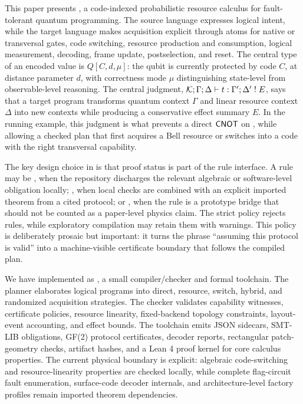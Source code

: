 This paper presents \system, a code-indexed probabilistic resource calculus for fault-tolerant quantum programming.
The source language expresses logical intent, while the target language makes acquisition explicit through atoms for native or transversal gates, code switching, resource production and consumption, logical measurement, decoding, frame update, postselection, and reset.
The central type of an encoded value is $Q[C,d,\mu]$: the qubit is currently protected by code $C$, at distance parameter $d$, with correctness mode $\mu$ distinguishing state-level from observable-level reasoning.
The central judgment, $\mathcal{K};\Gamma;\Delta \vdash t : \Gamma';\Delta' \;!\; E$, says that a target program transforms quantum context $\Gamma$ and linear resource context $\Delta$ into new contexts while producing a conservative effect summary $E$.
In the running example, this judgment is what prevents a direct $\mathsf{CNOT}$ on , while allowing a checked plan that first acquires a Bell resource or switches into a code with the right transversal capability.

The key design choice in \system is that proof status is part of the rule interface.
A rule may be \Checked, when the repository discharges the relevant algebraic or software-level obligation locally; \Certified, when local checks are combined with an explicit imported theorem from a cited protocol; or \Assumed, when the rule is a prototype bridge that should not be counted as a paper-level physics claim.
The strict policy rejects \Assumed{} rules, while exploratory compilation may retain them with warnings.
This policy is deliberately prosaic but important: it turns the phrase ``assuming this protocol is valid'' into a machine-visible certificate boundary that follows the compiled plan.

We have implemented \system as \lang, a small compiler/checker and formal toolchain.
The planner elaborates logical programs into direct, resource, switch, hybrid, and randomized acquisition strategies.
The checker validates capability witnesses, certificate policies, resource linearity, fixed-backend topology constraints, layout-event accounting, and effect bounds.
The toolchain emits JSON sidecars, SMT-LIB obligations, GF(2) protocol certificates, decoder reports, rectangular patch-geometry checks, artifact hashes, and a Lean 4 proof kernel for core calculus properties.
The current physical boundary is explicit: algebraic code-switching and resource-linearity properties are checked locally, while complete flag-circuit fault enumeration, surface-code decoder internals, and architecture-level factory profiles remain imported theorem dependencies.

